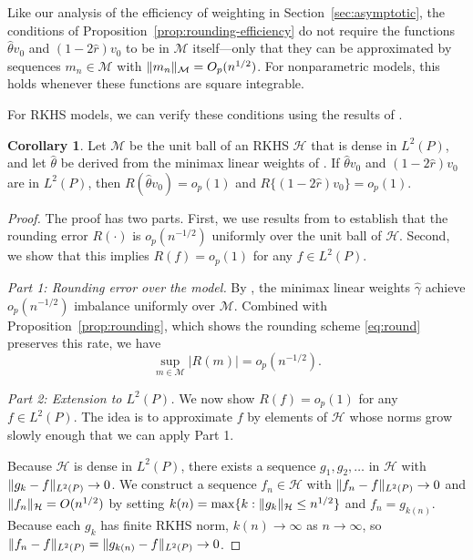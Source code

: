 \documentclass{article}
\newcommand{\paragraph}[1]{\par\noindent\textit{#1}\enspace}
\DeclarePairedDelimiter\norm{\lVert}{\rVert}
\theoremstyle{definition}
\newtheorem{corollary}[theorem]{Corollary}
\newcommand{\calH}{\ensuremath{\mathcal{H}}}
\newcommand{\model}{\mathcal{M}}
\newcommand{\<}{\langle}
\renewcommand{\>}{\rangle}
\begin{document}
\begin{refsection}
Like our analysis of the efficiency of weighting in Section~\ref{sec:asymptotic}, the conditions of Proposition~\ref{prop:rounding-efficiency} do not require the functions $\hat\theta v_0$ and $(1-2\hat r) v_0$ to be in $\model$ itself---only that they can be approximated by sequences $m_n \in \model$ with $\norm{m_n}_\model = O_p(n^{1/2})$. For nonparametric models, this holds whenever these functions are square integrable.

For RKHS models, we can verify these conditions using the results of \citet{hirshberg2019minimax}.

\begin{corollary}
\label{cor:rounding-efficiency-rkhs}
Let $\model$ be the unit ball of an RKHS $\calH$ that is dense in $L^2(P)$, and let $\hat\theta$ be derived from the minimax linear weights of \citet{hirshberg2019minimax}. If $\hat\theta v_0$ and $(1-2\hat r)v_0$ are in $L^2(P)$, then $R(\hat\theta v_0) = o_p(1)$ and $R\{(1-2\hat r)v_0\} = o_p(1)$.
\end{corollary}

\begin{proof}
The proof has two parts. First, we use results from \citet{hirshberg2019minimax} to establish that the rounding error $R(\cdot)$ is $o_p(n^{-1/2})$ uniformly over the unit ball of $\calH$. Second, we show that this implies $R(f) = o_p(1)$ for any $f \in L^2(P)$.

\paragraph{Part 1: Rounding error over the model.}
By \citet[Theorem 2]{hirshberg2019minimax}, the minimax linear weights $\hat\gamma$ achieve $o_p(n^{-1/2})$ imbalance uniformly over $\model$. Combined with Proposition~\ref{prop:rounding}, which shows the rounding scheme \eqref{eq:round} preserves this rate, we have
\[
\sup_{m \in \model} |R(m)| = o_p(n^{-1/2}).
\]

\paragraph{Part 2: Extension to $L^2(P)$.}
We now show $R(f) = o_p(1)$ for any $f \in L^2(P)$. The idea is to approximate $f$ by elements of $\calH$ whose norms grow slowly enough that we can apply Part 1.

Because $\calH$ is dense in $L^2(P)$, there exists a sequence $g_1, g_2, \ldots$ in $\calH$ with $\norm{g_k - f}_{L^2(P)} \to 0$. We construct a sequence $f_n \in \calH$ with $\norm{f_n - f}_{L^2(P)} \to 0$ and $\norm{f_n}_\calH = O(n^{1/2})$ by setting $k(n) = \max\{k : \norm{g_k}_\calH \le n^{1/2}\}$ and $f_n = g_{k(n)}$. Because each $g_k$ has finite RKHS norm, $k(n) \to \infty$ as $n \to \infty$, so $\norm{f_n - f}_{L^2(P)} = \norm{g_{k(n)} - f}_{L^2(P)} \to 0$.


\end{proof}
\end{refsection}
\end{document}
